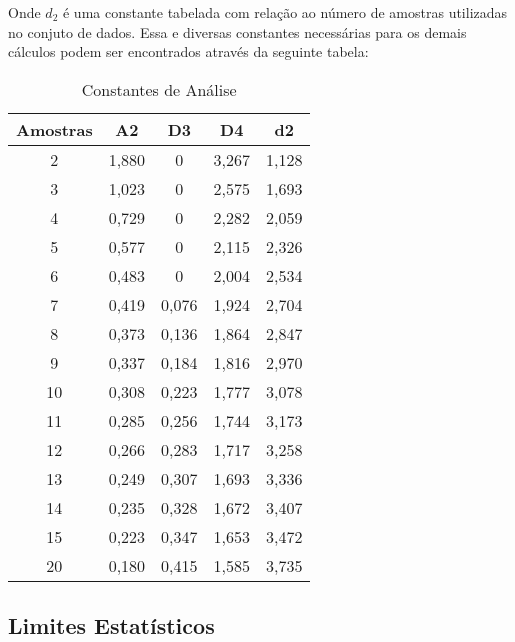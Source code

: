 \documentclass{article}
\begin{document}
            Onde $d_{2}$ é uma constante tabelada com relação ao número de amostras utilizadas no conjuto de dados. Essa e diversas constantes necessárias para os demais cálculos podem ser encontrados através da seguinte tabela:
                \begin{table}[H]
                    \centering
                    \begin{tabular}[]{c | c c c c}\hline
                        Amostras & A2    & D3    & D4    & d2\\\hline
                        2        & 1,880 & 0     & 3,267 & 1,128\\
                        3        & 1,023 & 0     & 2,575 & 1,693\\
                        4        & 0,729 & 0     & 2,282 & 2,059\\
                        5        & 0,577 & 0     & 2,115 & 2,326\\
                        6        & 0,483 & 0     & 2,004 & 2,534\\
                        7        & 0,419 & 0,076 & 1,924 & 2,704\\
                        8        & 0,373 & 0,136 & 1,864 & 2,847\\
                        9        & 0,337 & 0,184 & 1,816 & 2,970\\
                        10       & 0,308 & 0,223 & 1,777 & 3,078\\
                        11       & 0,285 & 0,256 & 1,744 & 3,173\\
                        12       & 0,266 & 0,283 & 1,717 & 3,258\\
                        13       & 0,249 & 0,307 & 1,693 & 3,336\\
                        14       & 0,235 & 0,328 & 1,672 & 3,407\\
                        15       & 0,223 & 0,347 & 1,653 & 3,472\\
                        20       & 0,180 & 0,415 & 1,585 & 3,735\\\hline
                    \end{tabular}
                    \caption{Constantes de Análise}
                \end{table}

        \subsection{Limites Estatísticos}
\end{document}

